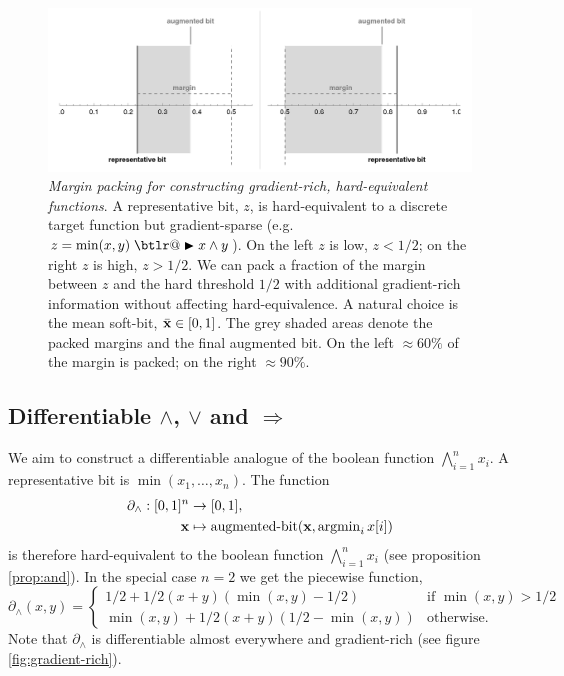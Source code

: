 \documentclass{article} %
\makeatletter
\DeclareRobustCommand{\btright}{\mathrel{\mathpalette\btlr@\blacktriangleright}}
\newcommand{\btlr@}[2]{%
	\begingroup
	\sbox\z@{$\m@th#1\triangleright$}%
	\sbox\tw@{\resizebox{1.1\wd\z@}{1.1\ht\z@}{\raisebox{\depth}{$\m@th#1\mkern-1mu#2$}}}%
	\ht\tw@=\ht\z@ \dp\tw@=\dp\z@ \wd\tw@=\wd\z@
	\copy\tw@
	\endgroup
}
\makeatother
\begin{document}
\begin{figure}[t!]
	\centering
	\includegraphics[trim=30pt 5pt 30pt 10pt, clip, width=1.0\textwidth]{margin-trick.png}
	\caption{{\em Margin packing for constructing gradient-rich, hard-equivalent functions}. A representative bit, $z$, is hard-equivalent to a discrete target function but gradient-sparse (e.g. $z=\operatorname{min}(x,y) \btright x \wedge y$). On the left $z$ is low, $z<1/2$; on the right $z$ is high, $z>1/2$. We can pack a fraction of the margin between $z$ and the hard threshold $1/2$ with additional gradient-rich information without affecting hard-equivalence. A natural choice is the mean soft-bit, $\bar{\bf x} \in [0,1]$. The grey shaded areas denote the packed margins and the final augmented bit. On the left $\approx 60\%$ of the margin is packed; on the right $\approx 90\%$.}
	\label{fig:margin-trick}
\end{figure}

\subsection{Differentiable $\wedge$, $\vee$ and $\Rightarrow$}

We aim to construct a differentiable analogue of the boolean function $\bigwedge_{i=1}^{n} x_i$. A representative bit is $\operatorname{min}(x_{1},\dots,x_{n})$. The function
\begin{equation*}
\begin{aligned}
\partial_{\wedge}: [0,1]^{n} &\to [0,1], \\
{\bf x} &\mapsto \operatorname{augmented-bit}({\bf x}, \operatorname{argmin}\limits_{i} x[i])
\end{aligned}
\end{equation*}
is therefore hard-equivalent to the boolean function $\bigwedge_{i=1}^{n} x_i$ (see proposition \ref{prop:and}). In the special case $n=2$ we get the piecewise function,
\begin{equation*}
\partial_{\wedge}\!(x, y) =
	\begin{cases}
	1/2 + 1/2(x + y)(\operatorname{min}(x,y) - 1/2) & \text{if } \operatorname{min}(x,y) > 1/2 \\
	\operatorname{min}(x,y) + 1/2(x + y)(1/2 - \operatorname{min}(x,y)) & \text{otherwise.}
	\end{cases}
\end{equation*}
Note that $\partial_{\wedge}$ is differentiable almost everywhere and gradient-rich (see figure \ref{fig:gradient-rich}).
\end{document}
